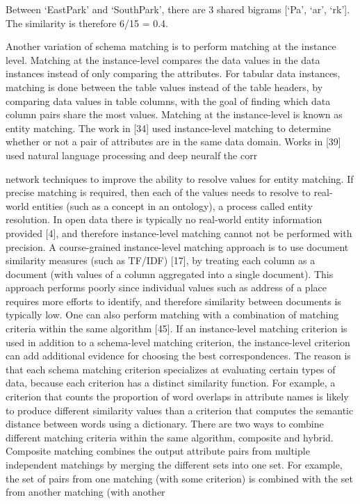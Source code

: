 Between `EastPark' and `SouthPark', there are 3 shared bigrams [`Pa', `ar', `rk']. The similarity is therefore 6/15 = 0.4.

Another variation of schema matching is to perform matching at the instance level. Matching at the instance-level compares the data values in the data instances instead of only comparing the attributes. For tabular data instances, matching is done between the table values instead of the table headers, by comparing data values in table columns, with the goal of finding which data column pairs share the most values. Matching at the instance-level is known as entity matching. The work in [34] used instance-level matching to determine whether or not a pair of attributes are in the same data domain. Works in [39] used natural language processing and deep neuralf the corr

network techniques to improve the ability to resolve values for entity matching. If precise matching is required, then each of the values needs to resolve to real-world entities (such as a concept in an ontology), a process called entity resolution. In open data there is typically no real-world entity information provided [4], and therefore instance-level matching cannot not be performed with precision. A course-grained instance-level matching approach is to use document similarity measures (such as TF/IDF) [17], by treating each column as a document (with values of a column aggregated into a single document). This approach performs poorly since individual values such as address of a place requires more efforts to identify, and therefore similarity between documents is typically low.
One can also perform matching with a combination of matching criteria within the same algorithm [45]. If an instance-level matching criterion is used in addition to a schema-level matching criterion, the instance-level criterion can add additional evidence for choosing the best correspondences. The reason is that each schema matching criterion specializes at evaluating certain types of data, because each criterion has a distinct similarity function. For example, a criterion that counts the proportion of word overlaps in attribute names is likely to produce different similarity values than a criterion that computes the semantic distance between words using a dictionary.
There are two ways to combine different matching criteria within the same algorithm, composite and hybrid. Composite matching combines the output attribute pairs from multiple independent matchings by merging the different sets into one set. For example, the set of pairs from one matching (with some criterion) is combined with the set from another matching (with another

